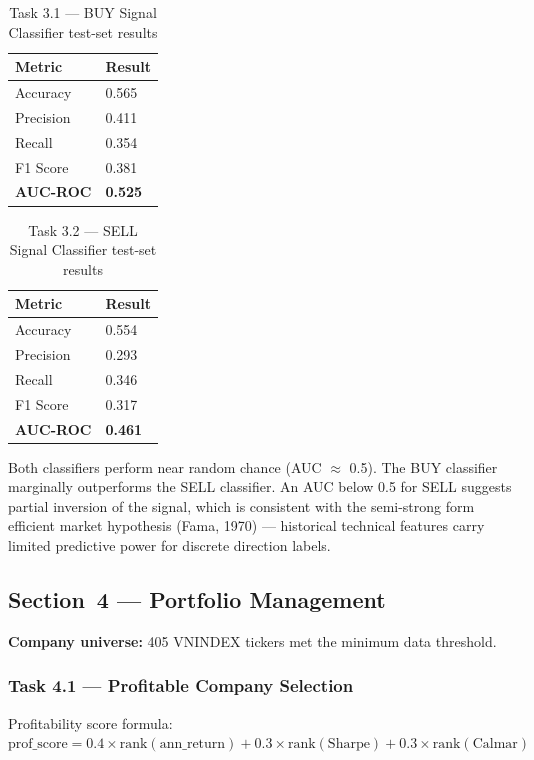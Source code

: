 \documentclass[12pt,a4paper]{article}
\begin{document}
\begin{table}[H]
\centering
\caption{Task 3.1 --- BUY Signal Classifier test-set results}
\begin{tabular}{ll}
\toprule
\textbf{Metric} & \textbf{Result} \\
\midrule
Accuracy  & 0.565 \\
Precision & 0.411 \\
Recall    & 0.354 \\
F1 Score  & 0.381 \\
\textbf{AUC-ROC} & \textbf{0.525} \\
\bottomrule
\end{tabular}
\end{table}

\begin{table}[H]
\centering
\caption{Task 3.2 --- SELL Signal Classifier test-set results}
\begin{tabular}{ll}
\toprule
\textbf{Metric} & \textbf{Result} \\
\midrule
Accuracy  & 0.554 \\
Precision & 0.293 \\
Recall    & 0.346 \\
F1 Score  & 0.317 \\
\textbf{AUC-ROC} & \textbf{0.461} \\
\bottomrule
\end{tabular}
\end{table}

Both classifiers perform near random chance (AUC $\approx$ 0.5). The BUY
classifier marginally outperforms the SELL classifier. An AUC below 0.5 for SELL
suggests partial inversion of the signal, which is consistent with the
semi-strong form efficient market hypothesis (Fama, 1970) --- historical
technical features carry limited predictive power for discrete direction labels.

\subsection{Section~4 --- Portfolio Management}

\textbf{Company universe:} 405 VNINDEX tickers met the minimum data threshold.

\subsubsection{Task 4.1 --- Profitable Company Selection}

Profitability score formula:
$\text{prof\_score} = 0.4\times\text{rank}(\text{ann\_return})
+ 0.3\times\text{rank}(\text{Sharpe})
+ 0.3\times\text{rank}(\text{Calmar})$
\end{document}
